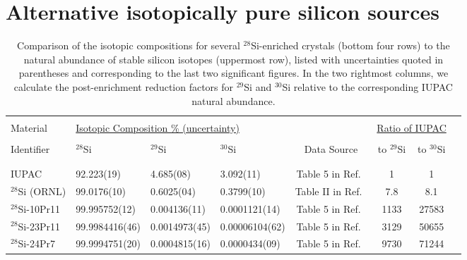 \documentclass[final,5p]{elsarticle}
\def\esi{$^{28}$Si\xspace}
\begin{document}


\section{Alternative isotopically pure silicon sources}\label{sec:isotopically_pure}
\begin{table*}[ht]
\small
\begin{center}
\begin{tabular}{ l l l l c c c c}
\hline 
& & & & & & \\[-1em]
Material &  \multicolumn{3}{l}{\underline{Isotopic Composition \% (uncertainty)}}   &       & \multicolumn{2}{c}{\underline{Ratio of IUPAC}}\\
& & & & & & \\[-1em]
Identifier & $^{28}$Si & $^{29}$Si & $^{30}$Si & Data Source & to $^{29}$Si & to $^{30}$Si  \\
& & & & & & \\[-1em]
\hline
& & & & & & \\[-1em]
IUPAC & 92.223(19) & 4.685(08) & 3.092(11) & Table 5 in Ref.\ \cite{IUPAC} & 1 & 1 \\
$^{28}$Si (ORNL) & 99.0176(10) & 0.6025(04) & 0.3799(10) & Table II in Ref.\ \cite{becker} & 7.8 & 8.1 \\
$^{28}$Si-10Pr11 & 99.995752(12) & 0.004136(11) & 0.0001121(14) & Table 5 in Ref.\ \cite{fujii} & 1133 & 27583 \\
 $^{28}$Si-23Pr11 & 99.9984416(46) & 0.0014973(45) & 0.00006104(62) & Table 5 in Ref.\ \cite{fujii} & 3129 & 50655 \\
 $^{28}$Si-24Pr7 & 99.9994751(20) & 0.0004815(16) & 0.0000434(09) & Table 5 in Ref.\ \cite{fujii} & 9730 & 71244 \\
\hline
\end{tabular}
\end{center}
\caption{\small Comparison of the isotopic compositions for several \esi-enriched crystals (bottom four rows) to the natural abundance of stable silicon isotopes (uppermost row), listed with uncertainties quoted in parentheses and corresponding to the last two significant figures. In the two rightmost columns, we calculate the post-enrichment reduction factors for $^{29}$Si and $^{30}$Si relative to the corresponding IUPAC natural abundance.}
\label{tab:silicon-28}
\end{table*}
\end{document}

